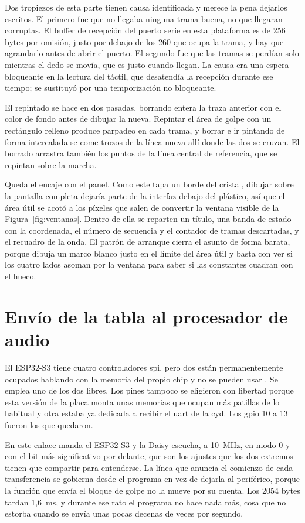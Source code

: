 Dos tropiezos de esta parte tienen causa identificada y merece la pena dejarlos
escritos. El primero fue que no llegaba ninguna trama buena, no que llegaran
corruptas. El buffer de recepción del puerto serie en esta plataforma es de 256
bytes por omisión, justo por debajo de los 260 que ocupa la trama, y hay que
agrandarlo antes de abrir el puerto. El segundo fue que las tramas se perdían
solo mientras el dedo se movía, que es justo cuando llegan. La causa era una
espera bloqueante en la lectura del táctil, que desatendía la recepción durante
ese tiempo; se sustituyó por una temporización no bloqueante.

El repintado se hace en dos pasadas, borrando entera la traza anterior con el
color de fondo antes de dibujar la nueva. Repintar el área de golpe con un
rectángulo relleno produce parpadeo en cada trama, y borrar e ir pintando de
forma intercalada se come trozos de la línea nueva allí donde las dos se cruzan.
El borrado arrastra también los puntos de la línea central de referencia, que se
repintan sobre la marcha.

Queda el encaje con el panel. Como este tapa un borde del cristal, dibujar sobre
la pantalla completa dejaría parte de la interfaz debajo del plástico, así que el
área útil se acotó a los píxeles que salen de convertir la ventana visible de la
Figura~\ref{fig:ventanas}. Dentro de ella se reparten un título, una banda de
estado con la coordenada, el número de secuencia y el contador de tramas
descartadas, y el recuadro de la onda. El patrón de arranque cierra el
asunto de forma barata, porque dibuja un marco blanco justo en el límite del área
útil y basta con ver si los cuatro lados asoman por la ventana para saber si las
constantes cuadran con el hueco.

\section{Envío de la tabla al procesador de audio}
\label{sec:emisor-spi}

El ESP32-S3 tiene cuatro controladores \gls{spi}, pero dos están permanentemente 
ocupados hablando con la memoria del propio chip y no se pueden usar \cite{EspressifS3}. 
Se emplea uno de los dos libres. Los pines tampoco se eligieron con libertad
porque esta versión de la placa monta unas memorias que ocupan más patillas de 
lo habitual y otra estaba ya dedicada a recibir el \gls{uart} de la \gls{cyd}. 
Los \gls{gpio} 10 a 13 fueron los que quedaron.

En este enlace manda el ESP32-S3 y la Daisy escucha, a 10~MHz, en modo 0 y con el 
bit más significativo por delante, que son los ajustes que los dos extremos tienen 
que compartir para entenderse. La línea que anuncia el comienzo de cada transferencia 
se gobierna desde el programa en vez de dejarla al periférico, porque la función que 
envía el bloque de golpe no la mueve por su cuenta. Los 2054 bytes tardan 1,6~ms, y 
durante ese rato el programa no hace nada más, cosa que no estorba cuando se envía 
unas pocas decenas de veces por segundo.

